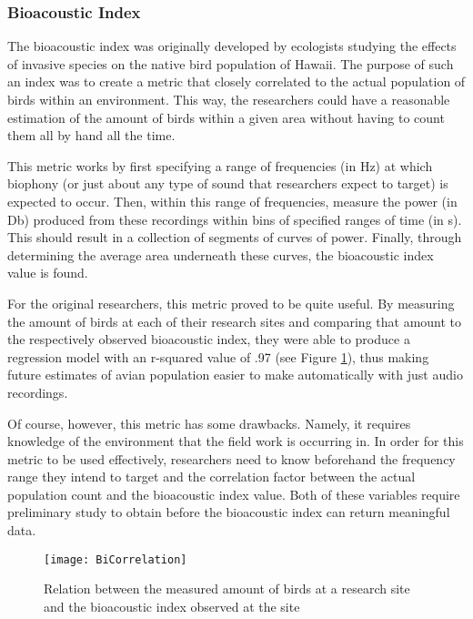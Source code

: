 \subsubsection{Bioacoustic Index}
The bioacoustic index was originally developed by ecologists studying the effects of invasive species on the native bird population of Hawaii. The purpose of such an index was to create a metric that closely correlated to the actual population of birds within an environment. This way, the researchers could have a reasonable estimation of the amount of birds within a given area without having to count them all by hand all the time.\par
This metric works by first specifying a range of frequencies (in Hz) at which biophony (or just about any type of sound that researchers expect to target) is expected to occur. Then, within this range of frequencies, measure the power (in Db) produced from these recordings within bins of specified ranges of time (in s). This should result in a collection of segments of curves of power. Finally, through determining the average area underneath these curves, the bioacoustic index value is found.\par
For the original researchers, this metric proved to be quite useful. By measuring the amount of birds at each of their research sites and comparing that amount to the respectively observed bioacoustic index, they were able to produce a regression model with an r-squared value of .97 (see Figure \ref{fig:BiCorrelation}), thus making future estimates of avian population easier to make automatically with just audio recordings.\cite{boelman}\par
Of course, however, this metric has some drawbacks. Namely, it requires knowledge of the environment that the field work is occurring in. In order for this metric to be used effectively, researchers need to know beforehand the frequency range they intend to target and the correlation factor between the actual population count and the bioacoustic index value. Both of these variables require preliminary study to obtain before the bioacoustic index can return meaningful data.\par
\begin{figure}
  \begin{center}
    \texttt{[image: BiCorrelation]}
  \end{center}
  \caption{Relation between the measured amount of birds at a research site and the bioacoustic index observed at the site}
  \label{fig:BiCorrelation}
\end{figure}
